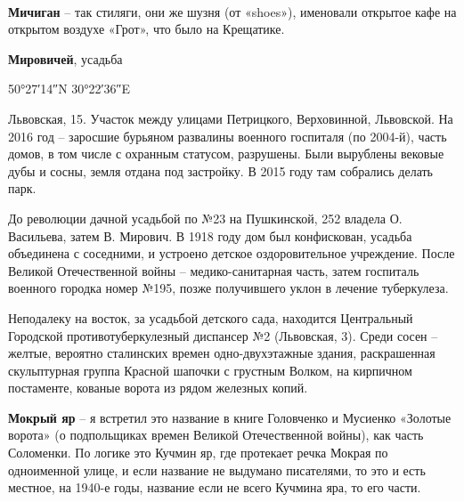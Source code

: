 \\

\medskip

\textbf{Мичиган} – так стиляги, они же шузня (от «shoes»), именовали открытое кафе на открытом воздухе «Грот», что было на Крещатике.\\

\medskip

\textbf{Мировичей}, усадьба

50°27′14″N 30°22′36″E

Львовская, 15. Участок между улицами Петрицкого, Верховинной, Львовской. На 2016 год – заросшие бурьяном развалины военного госпиталя (по 2004-й), часть домов, в том числе с охранным статусом, разрушены. Были вырублены вековые дубы и сосны, земля отдана под застройку. В 2015 году там собрались делать парк.

До революции дачной усадьбой по №23 на Пушкинской, 252 владела О. Васильева, затем В. Мирович. В 1918 году дом был конфискован, усадьба объединена с соседними, и устроено детское оздоровительное учреждение. После Великой Отечественной войны – медико-санитарная часть, затем госпиталь военного городка номер №195, позже получившего уклон в лечение туберкулеза.

Неподалеку на восток, за усадьбой детского сада, находится Центральный Городской противотуберкулезный диспансер №2 (Львовская, 3). Среди сосен – желтые, вероятно сталинских времен одно-двухэтажные здания, раскрашенная скульптурная группа Красной шапочки с грустным Волком, на кирпичном постаменте, кованые ворота из рядом железных копий.\\

\medskip


\textbf{Мокрый яр} – я встретил это название в книге Головченко и Мусиенко «Золотые ворота» (о подпольщиках времен Великой Отечественной войны), как часть Соломенки. По логике это Кучмин яр, где протекает речка Мокрая по одноименной улице, и если название не выдумано писателями, то это и есть местное, на 1940-е годы, название если не всего Кучмина яра, то его части.\\


